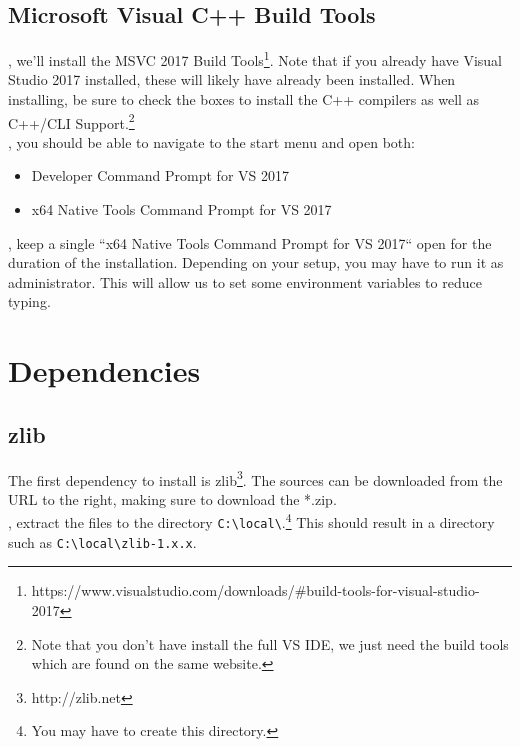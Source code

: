 \documentclass{tufte-handout}
\begin{document}
\subsection{Microsoft Visual C++ Build Tools}

, we'll install the MSVC 2017 Build
Tools\footnote{https://www.visualstudio.com/downloads/\#build-tools-for-visual-studio-2017}.
Note that if you already have Visual Studio 2017 installed, these will likely have already
been installed.  When installing, be sure to check the boxes to install the C++ compilers as well 
as C++/CLI Support.\footnote{Note that you don't have install the full VS IDE, we just need the
build tools which are found on the same website.} \\ 

, you should be able to navigate to the start menu and open both:
\begin{itemize}
    
    \item Developer Command Prompt for VS 2017
    \item x64 Native Tools Command Prompt for VS 2017

\end{itemize}

, keep a single ``x64 Native Tools Command Prompt for VS 2017`` open
for the duration of the installation.  Depending on your setup, you may have to run it as 
administrator.  This will allow us to set some environment variables to reduce typing.

\section{Dependencies}

\subsection{zlib}

The first dependency to install is zlib\footnote{http://zlib.net}.  The sources can be downloaded
from the URL to the right, making sure to download the *.zip. \\

    , extract the files to the directory \Verb|C:\local\|.\footnote{
    You may have to create this directory.}  This should result in a directory such as
    \Verb|C:\local\zlib-1.x.x|.
\end{document}
